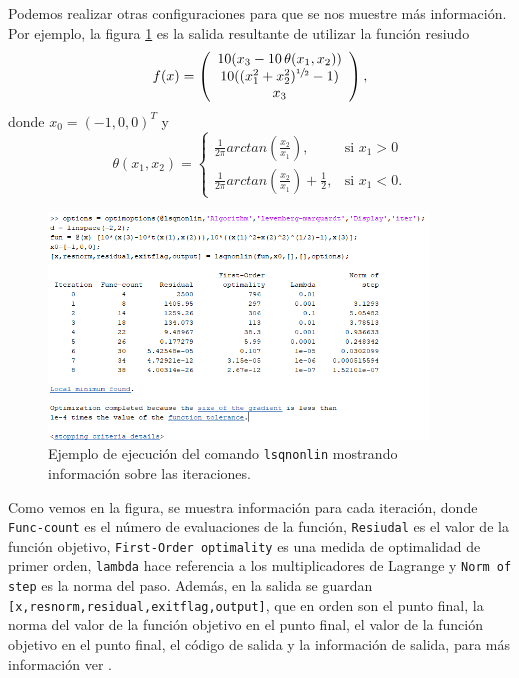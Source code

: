 \documentclass[11pt,a4paper]{book}
\theoremstyle{definition}
\theoremstyle{remark}
\def\code#1{\texttt{#1}}
\begin{document}
Podemos realizar otras configuraciones para que se nos muestre más información. Por ejemplo, la figura \ref{fig:lsqnonlin-iter} es la salida resultante de utilizar la función resiudo
\begin{equation}
f(x)=\left(
\begin{array}{c}
	10(x_3-10\,\theta(x_1,x_2)) \\
	10((x_1^2+x_2^2)^{\sfrac{1}{2}}-1) \\
	x_3
\end{array}
\right),
\end{equation}
donde $x_0 = (-1,0,0)^T$ y
\begin{equation}\label{eq:theta}
\theta(x_1,x_2)=\begin{cases}
	\frac{1}{2\pi}arctan\left(\frac{x_2}{x_1}\right), & \text{si } x_1 > 0 \\
	\frac{1}{2\pi}arctan\left(\frac{x_2}{x_1}\right)+\frac{1}{2}, & \text{si } x_1 < 0.
\end{cases}
\end{equation}

\begin{figure}[ht]
	\centering
	\includegraphics[width=0.9\textwidth]{imgs/lsqiter.png}
	\caption{Ejemplo de ejecución del comando \code{lsqnonlin} mostrando información sobre las iteraciones.}
	\label{fig:lsqnonlin-iter}
\end{figure}

Como vemos en la figura, se muestra información para cada iteración, donde \code{Func-count} es el número de evaluaciones de la función, \code{Resiudal} es el valor de la función objetivo, \code{First-Order optimality} es una medida de optimalidad de primer orden, \code{lambda} hace referencia a los multiplicadores de Lagrange y \code{Norm of step} es la norma del paso. Además, en la salida se guardan \code{[x,resnorm,residual,exitflag,output]}, que en orden son el punto final, la norma del valor de la función objetivo en el punto final, el valor de la función objetivo en el punto final, el código de salida y la información de salida, para más información ver \cite{lsqnonlin}.
\end{document}
